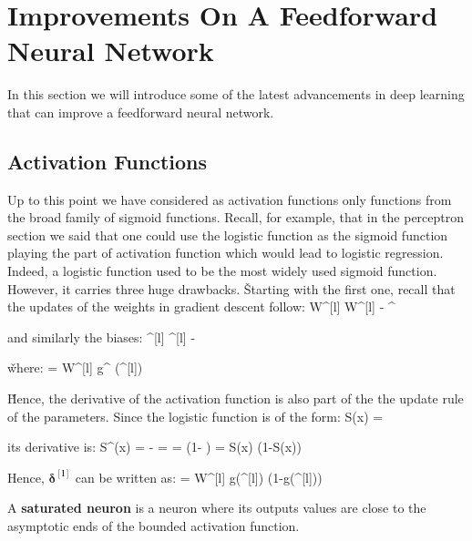 \section{Improvements On A Feedforward Neural Network}

In this section we will introduce some of the latest advancements in deep learning that can improve a feedforward 
neural network.

\subsection{Activation Functions}

Up to this point we have considered as activation functions only functions from the broad family of sigmoid functions.
Recall, for example, that in the perceptron section we said that one could use the logistic function as the sigmoid
function playing the part of activation function which would lead to logistic regression. Indeed, a logistic function
used to be the most widely used sigmoid function. However, it carries three huge drawbacks. \v

Starting with the first one, recall that the updates of the weights in gradient descent follow:
\bse
W^{[l]} \coloneqq W^{[l]} - \alpha \cdot\boldsymbol{\delta^{[l]}} ^{\intercal}
\ese

and similarly the biases:
\bse
{}^{[l]} \coloneqq {}^{[l]} - \alpha \cdot \boldsymbol{\delta^{[l]}}
\ese

\v

where:
\bse
\boldsymbol{\delta^{[l]}} = \boldsymbol{\delta^{[l+1]}} \cdot W^{[l]} \cdot g^{\prime} ({}^{[l]})
\ese

\v

Hence, the derivative of the activation function is also part of the the update rule of the parameters. Since the
logistic function is of the form:
\bse
S(x) = 
\ese

its derivative is:
\bse
S^{\prime}(x) = -  =  \cdot {} 
=  \cdot \left(1- \right) = S(x) \cdot (1-S(x))
\ese

Hence, $\boldsymbol{\delta^{[l]}}$ can be written as:
\bse
\boldsymbol{\delta^{[l]}} = \boldsymbol{\delta^{[l+1]}} \cdot W^{[l]} 
\cdot g({}^{[l]}) \cdot (1-g({}^{[l]}))
\ese

A \textbf{saturated neuron} is a neuron where its outputs values are close to the asymptotic ends of the bounded 
activation function. 
\ed

